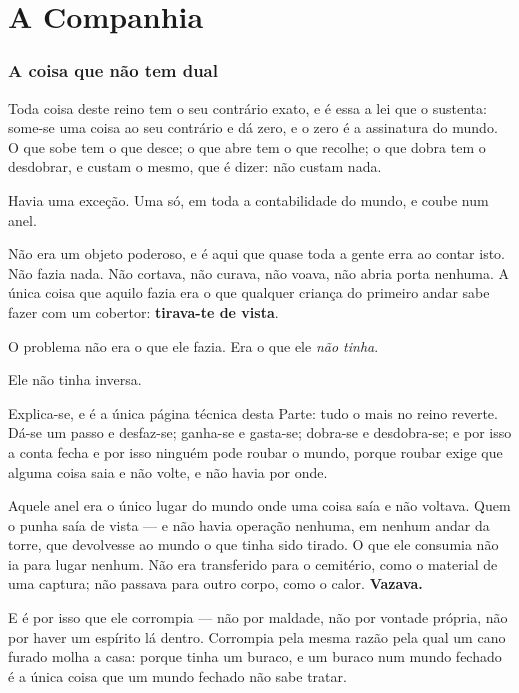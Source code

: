\documentclass[livro.tex]{subfiles}
\begin{document}

\part{A Companhia}

\section{A coisa que não tem dual}

Toda coisa deste reino tem o seu contrário exato, e é essa a lei que o sustenta: some-se
uma coisa ao seu contrário e dá zero, e o zero é a assinatura do mundo. O que sobe tem o
que desce; o que abre tem o que recolhe; o que dobra tem o desdobrar, e custam o mesmo,
que é dizer: não custam nada.

Havia uma exceção. Uma só, em toda a contabilidade do mundo, e coube num anel.

\medskip

Não era um objeto poderoso, e é aqui que quase toda a gente erra ao contar isto. Não fazia
nada. Não cortava, não curava, não voava, não abria porta nenhuma. A única coisa que
aquilo fazia era o que qualquer criança do primeiro andar sabe fazer com um cobertor:
\textbf{tirava-te de vista}.

O problema não era o que ele fazia. Era o que ele \emph{não tinha}.

Ele não tinha inversa.

\medskip

Explica-se, e é a única página técnica desta Parte: tudo o mais no reino reverte. Dá-se um
passo e desfaz-se; ganha-se e gasta-se; dobra-se e desdobra-se; e por isso a conta fecha e
por isso ninguém pode roubar o mundo, porque roubar exige que alguma coisa saia e não
volte, e não havia por onde.

Aquele anel era o único lugar do mundo onde uma coisa saía e não voltava. Quem o punha
saía de vista --- e não havia operação nenhuma, em nenhum andar da torre, que devolvesse
ao mundo o que tinha sido tirado. O que ele consumia não ia para lugar nenhum. Não era
transferido para o cemitério, como o material de uma captura; não passava para outro
corpo, como o calor. \textbf{Vazava.}

E é por isso que ele corrompia --- não por maldade, não por vontade própria, não por
haver um espírito lá dentro. Corrompia pela mesma razão pela qual um cano furado molha a
casa: porque tinha um buraco, e um buraco num mundo fechado é a única coisa que um mundo
fechado não sabe tratar.
\end{document}
